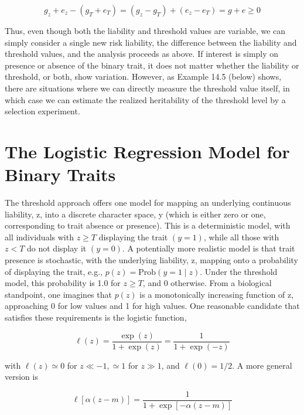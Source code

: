 \documentclass{article}
\begin{document}
\begin{equation}
g_{z}+e_{z}-\left(g_{T}+e_{T}\right)=\left(g_{z}-g_{T}\right)+\left(e_{z}-e_{T}\right)=g+e\geq0
\end{equation}

Thus, even though both the liability and threshold values are variable, we can simply consider a single new risk liability, the difference between the liability and threshold values, and the analysis proceeds as above. If interest is simply on presence or absence of the binary trait, it does not matter whether the liability or threshold, or both, show variation. However, as Example 14.5 (below) shows, there are situations where we can directly measure the threshold value itself, in which case we can estimate the realized heritability of the threshold level by a selection experiment.

\section{The Logistic Regression Model for Binary Traits}
The threshold approach offers one model for mapping an underlying continuous liability, z, into a discrete character space, y (which is either zero or one, corresponding to trait absence or presence). This is a deterministic model, with all individuals with  $ z \geq T $ displaying the trait  $ (y = 1) $, while all those with  $ z < T $ do not display it  $ (y = 0) $. A potentially more realistic model is that trait presence is stochastic, with the underlying liability, z, mapping onto a probability of displaying the trait, e.g.,  $ p(z) = \text{Prob}(y = 1 \mid z) $. Under the threshold model, this probability is 1.0 for  $ z \geq T $, and 0 otherwise. From a biological standpoint, one imagines that  $ p(z) $ is a monotonically increasing function of z, approaching 0 for low values and 1 for high values. One reasonable candidate that satisfies these requirements is the logistic function,

\begin{equation}
\ell(z)=\frac{\exp(z)}{1+\exp(z)}=\frac{1}{1+\exp(-z)}
\tag{14.10a}
\label{eq:14_10a}
\end{equation}

with  $ \ell(z) \simeq 0 $ for  $ z \ll -1, \simeq 1 $ for  $ z \gg 1 $, and  $ \ell(0) = 1/2 $. A more general version is

\begin{equation}
\ell[\alpha\left(z-m\right)]=\frac{1}{1+\exp[-\alpha\left(z-m\right)]}
\tag{14.10b}
\label{eq:14_10b}
\end{equation}
\end{document}
